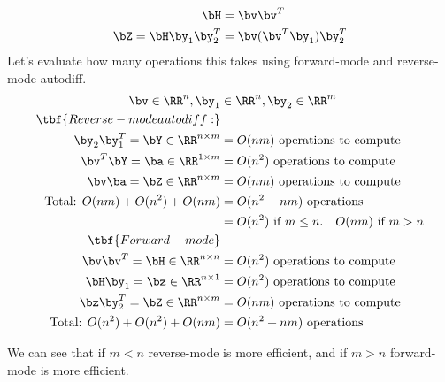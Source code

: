 \documentclass[12pt]{article}
\begin{document}
\begin{align*}
		\bH &= \bv \bv^T \\
		\bZ = \bH \by_1 \by_2^T &= \bv (\bv^T \by_1) \by_2^T
\end{align*}
Let's evaluate how many operations this takes using forward-mode and reverse-mode autodiff.
\begin{align*}
		\bv \in {\RR^n}, \by_1 &\in {\RR^n}, \by_2 \in {\RR^m} \\
		\tbf{Reverse-mode autodiff:} \\
		\by_2 \by_1^T =\bY \in \RR^{n \times m} &= O(n m) \text{ operations to compute} \\
		\bv^T \bY = \ba \in \RR^{1 \times m} &= O(n^2) \text{ operations to compute} \\
		\bv \ba = \bZ \in \RR^{n \times m} &= O(n m) \text{ operations to compute} \\
		\text{Total: } O(n m) + O(n^2) + O(n m) &= O(n^2 + n m) \text{ operations} \\
		&= O(n^2) \text{ if } m \leq n. \quad O(n m) \text{ if } m > n \\
		\tbf{Forward-mode} \\
		\bv \bv^T =\bH \in \RR^{n \times n} &= O(n^2) \text{ operations to compute} \\
		\bH \by_1 = \bz \in \RR^{n \times 1} &= O(n^2) \text{ operations to compute} \\
		\bz \by_2^T = \bZ \in \RR^{n \times m} &= O(n m) \text{ operations to compute} \\
		\text{Total: } O(n^2) + O(n^2) + O(n m) &= O(n^2 + n m) \text{ operations}
\end{align*}

We can see that if $m<n$ reverse-mode is more efficient, and if $m>n$ forward-mode is more efficient.
\end{document}
